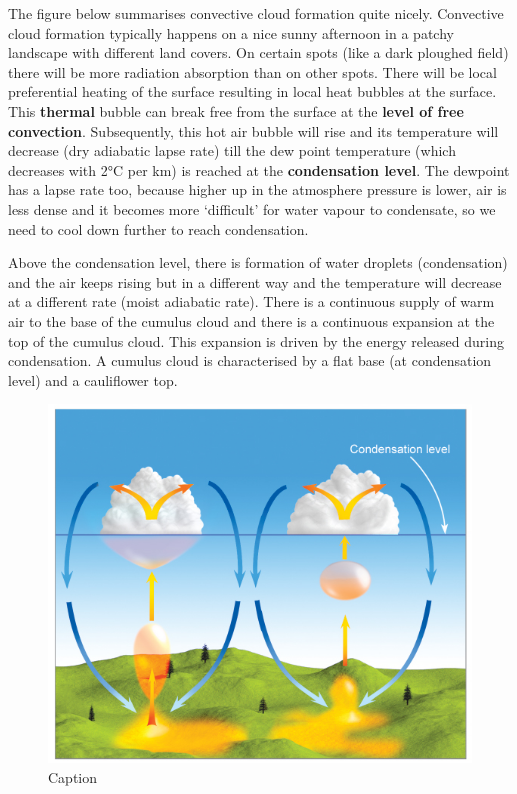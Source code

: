 \documentclass[12pt,oneside]{book}
\begin{document}
The figure below summarises convective cloud formation quite nicely.
Convective cloud formation typically happens on a nice sunny afternoon
in a patchy landscape with different land covers. On certain spots (like
a dark ploughed field) there will be more radiation absorption than on
other spots. There will be local preferential heating of the surface
resulting in local heat bubbles at the surface. This \textbf{thermal}
bubble can break free from the surface at the \textbf{level of free
convection}. Subsequently, this hot air bubble will rise and its
temperature will decrease (dry adiabatic lapse rate) till the dew point
temperature (which decreases with 2°C per km) is reached at the
\textbf{condensation level}. The dewpoint has a lapse rate too, because
higher up in the atmosphere pressure is lower, air is less dense and it
becomes more `difficult' for water vapour to condensate, so we need to
cool down further to reach condensation.

Above the condensation level, there is formation of water droplets
(condensation) and the air keeps rising but in a different way and the
temperature will decrease at a different rate (moist adiabatic rate).
There is a continuous supply of warm air to the base of the cumulus
cloud and there is a continuous expansion at the top of the cumulus
cloud. This expansion is driven by the energy released during
condensation. A cumulus cloud is characterised by a flat base (at
condensation level) and a cauliflower top.

\begin{figure}

{\centering \includegraphics[width=1\linewidth]{figures/Figure317} 

}

\caption{Caption}\label{fig:ConvectiveCloud}
\end{figure}
\end{document}
